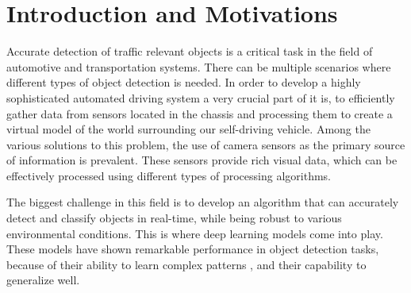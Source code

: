 \documentclass[11pt,a4paper,twoside,openright]{report}  %
\begin{document}

%
%


\selectthesislanguage


\renewcommand{\thesection}{\arabic{section}}
\renewcommand{\thesubsection}{\thesection.\arabic{subsection}}
\renewcommand{\thesubsubsection}{\thesubsection.\arabic{subsubsection}}
\tableofcontents\cleardoublepage




\section{Introduction and Motivations}\label{sec:introduction}
Accurate detection of traffic relevant objects is a critical task in the field of automotive and transportation systems.
There can be multiple scenarios where different types of object detection is needed.
In order to develop a highly sophisticated automated driving system a very crucial part of it is, to efficiently
gather data from sensors located in the chassis and processing them to create a virtual model of the world surrounding our self-driving vehicle.
Among the various solutions to this problem, the use of camera sensors as the primary source of information is prevalent.
These sensors provide rich visual data, which can be effectively processed using different types of processing algorithms.

The biggest challenge in this field is to develop an algorithm that can accurately detect and classify objects in real-time,
while being robust to various environmental conditions.
This is where deep learning models come into play.
These models have shown remarkable performance in object detection tasks, because of their ability to learn complex patterns ,
and their capability to generalize well.
\end{document}
